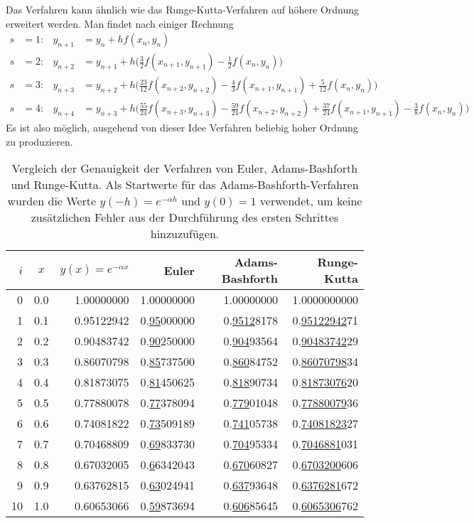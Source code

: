 Das Verfahren kann ähnlich wie das Runge-Kutta-Verfahren auf höhere
Ordnung erweitert werden.
Man findet nach einiger Rechnung
\begin{align*}
s&=1\colon&
y_{n+1}
&=
y_n+hf(x_n,y_n)
\\
s&=2\colon&
y_{n+2}
&=
y_{n+1}+h\biggl(\frac32f(x_{n+1},y_{n+1})-\frac12f(x_n,y_n)\biggr)
\\
s&=3\colon&
y_{n+3}
&=
y_{n+2}+h\biggl(\frac{23}{12}f(x_{n+2},y_{n+2})-\frac43f(x_{n+1},y_{n+1})+\frac{5}{12}f(x_n,y_n)\biggr)
\\
s&=4\colon&
y_{n+4}
&=
y_{n+3}+h\biggl(\frac{55}{24}f(x_{n+3},y_{n+3})
	-\frac{59}{24}f(x_{n+2},y_{n+2})
	+\frac{37}{24}f(x_{n+1},y_{n+1})
	-\frac{3}{8}f(x_n,y_n)
\biggr)
\end{align*}
Es ist also möglich, ausgehend von dieser Idee Verfahren beliebig hoher
Ordnung zu produzieren.

\begin{table}
\centering
\begin{tabular}{|r|c|r|r|r|r|}
\hline
$i$& $x$ & $y(x)=e^{-\alpha x}$&Euler&Adams-Bashforth&Runge-Kutta\\
\hline
 0 & 0.0 & 1.00000000 & 1.00000000 & 1.00000000 & 1.0000000000 \\
 1 & 0.1 & 0.95122942 & 0.\underline{95}000000 & 0.\underline{9512}8178 & 0.\underline{95122942}71 \\
 2 & 0.2 & 0.90483742 & 0.\underline{90}250000 & 0.\underline{904}93564 & 0.\underline{90483742}29 \\
 3 & 0.3 & 0.86070798 & 0.\underline{85}737500 & 0.\underline{860}84752 & 0.\underline{86070798}34 \\
 4 & 0.4 & 0.81873075 & 0.\underline{81}450625 & 0.\underline{818}90734 & 0.\underline{81873076}20 \\
 5 & 0.5 & 0.77880078 & 0.\underline{77}378094 & 0.\underline{779}01048 & 0.\underline{77880079}36 \\
 6 & 0.6 & 0.74081822 & 0.\underline{73}509189 & 0.\underline{741}05738 & 0.\underline{74081823}27 \\
 7 & 0.7 & 0.70468809 & 0.\underline{69}833730 & 0.\underline{704}95334 & 0.\underline{7046881}031 \\
 8 & 0.8 & 0.67032005 & 0.\underline{6}6342043 & 0.\underline{670}60827 & 0.\underline{6703200}606 \\
 9 & 0.9 & 0.63762815 & 0.\underline{63}024941 & 0.\underline{637}93648 & 0.\underline{6376281}672 \\
10 & 1.0 & 0.60653066 & 0.\underline{59}873694 & 0.\underline{606}85645 & 0.\underline{6065306}762 \\
\hline
\end{tabular}
\caption{Vergleich der Genauigkeit der Verfahren von Euler,
Adams-Bashforth und Runge-Kutta.
Als Startwerte für das Adams-Bashforth-Verfahren wurden die
Werte $y(-h)=e^{-\alpha h}$ und $y(0)=1$ verwendet, um keine zusätzlichen
Fehler aus der Durchführung des ersten Schrittes hinzuzufügen.
\label{buch:ode:genauigkeit-adams-bashforth}}
\end{table}


